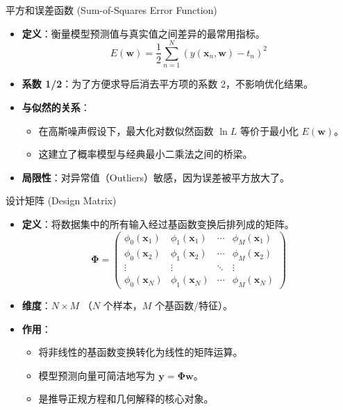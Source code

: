 \documentclass[12pt, aspectratio=169]{beamer}
\newcommand{\vect}[1]{\mathbf{#1}}
\begin{document}
\begin{frame}{平方和误差函数 (Sum-of-Squares Error Function)}
    \begin{itemize}
        \item \textbf{定义}：衡量模型预测值与真实值之间差异的最常用指标。
        $$ E(\vect{w}) = \frac{1}{2} \sum_{n=1}^N \left( y(\vect{x}_n, \vect{w}) - t_n \right)^2 $$
        \item \textbf{系数 1/2}：为了方便求导后消去平方项的系数 2，不影响优化结果。
        \item \textbf{与似然的关系}：
        \begin{itemize}
            \item 在高斯噪声假设下，最大化对数似然函数 $\ln L$ 等价于最小化 $E(\vect{w})$。
            \item 这建立了概率模型与经典最小二乘法之间的桥梁。
        \end{itemize}
        \item \textbf{局限性}：对异常值（Outliers）敏感，因为误差被平方放大了。
    \end{itemize}
\end{frame}

\begin{frame}{设计矩阵 (Design Matrix)}
    \begin{itemize}
        \item \textbf{定义}：将数据集中的所有输入经过基函数变换后排列成的矩阵。
        $$ \boldsymbol{\Phi} = \begin{pmatrix} 
        \phi_0(\vect{x}_1) & \phi_1(\vect{x}_1) & \cdots & \phi_M(\vect{x}_1) \\
        \phi_0(\vect{x}_2) & \phi_1(\vect{x}_2) & \cdots & \phi_M(\vect{x}_2) \\
        \vdots & \vdots & \ddots & \vdots \\
        \phi_0(\vect{x}_N) & \phi_1(\vect{x}_N) & \cdots & \phi_M(\vect{x}_N)
        \end{pmatrix} $$
        \item \textbf{维度}：$N \times M$ （$N$ 个样本，$M$ 个基函数/特征）。
        \item \textbf{作用}：
        \begin{itemize}
            \item 将非线性的基函数变换转化为线性的矩阵运算。
            \item 模型预测向量可简洁地写为 $\vect{y} = \boldsymbol{\Phi}\vect{w}$。
            \item 是推导正规方程和几何解释的核心对象。
        \end{itemize}
    \end{itemize}
\end{frame}
\end{document}
